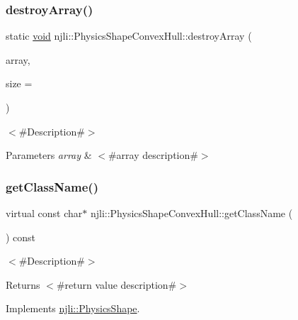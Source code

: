 \subsubsection{\texorpdfstring{destroy\+Array()}{destroyArray()}}
{\footnotesize\ttfamily static \mbox{\hyperlink{_thread_8h_af1e856da2e658414cb2456cb6f7ebc66}{void}} njli\+::\+Physics\+Shape\+Convex\+Hull\+::destroy\+Array (\begin{DoxyParamCaption}\item[{\mbox{\hyperlink{classnjli_1_1_physics_shape_convex_hull}{Physics\+Shape\+Convex\+Hull}} $\ast$$\ast$}]{array,  }\item[{const \mbox{\hyperlink{_util_8h_a10e94b422ef0c20dcdec20d31a1f5049}{u32}}}]{size = {} }\end{DoxyParamCaption})\hspace{0.3cm}{\ttfamily [static]}}

$<$\#\+Description\#$>$


\begin{DoxyParams}{Parameters}
{\em array} & $<$\#array description\#$>$ \\
\hline
\end{DoxyParams}
\mbox{\label{classnjli_1_1_physics_shape_convex_hull_a90c6c121436e997379305a4fe66bde0c}} 
\subsubsection{\texorpdfstring{get\+Class\+Name()}{getClassName()}}
{\footnotesize\ttfamily virtual const char$\ast$ njli\+::\+Physics\+Shape\+Convex\+Hull\+::get\+Class\+Name (\begin{DoxyParamCaption}{ }\end{DoxyParamCaption}) const\hspace{0.3cm}{\ttfamily [virtual]}}

$<$\#\+Description\#$>$

\begin{DoxyReturn}{Returns}
$<$\#return value description\#$>$ 
\end{DoxyReturn}


Implements \mbox{\hyperlink{classnjli_1_1_physics_shape_a72cb98a55614a3e264b8e4a157b45c64}{njli\+::\+Physics\+Shape}}.

